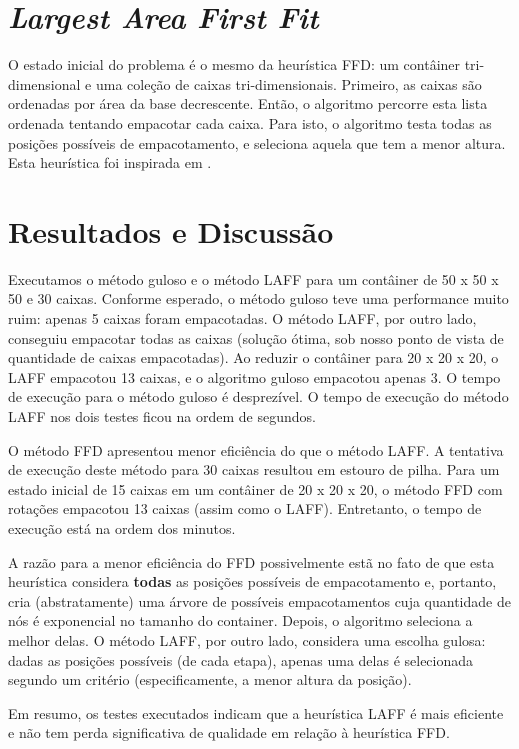 \documentclass[12pt]{article}
\begin{document}
\section{\emph{Largest Area First Fit}}

O estado inicial do problema é o mesmo da heurística FFD: um contâiner tri-dimensional e uma coleção de caixas tri-dimensionais. Primeiro, as caixas são ordenadas por área da base decrescente. Então, o algoritmo percorre esta lista ordenada tentando empacotar cada caixa. Para isto, o algoritmo testa todas as posições possíveis de empacotamento, e seleciona aquela que tem a menor altura. Esta heurística foi inspirada em \cite{gurbuz}.

\section{Resultados e Discussão}

Executamos o método guloso e o método LAFF para um contâiner de 50 x 50 x 50 e 30 caixas. Conforme esperado, o método guloso teve uma performance muito ruim: apenas 5 caixas foram empacotadas. O método LAFF, por outro lado, conseguiu empacotar todas as caixas (solução ótima, sob nosso ponto de vista de quantidade de caixas empacotadas). Ao reduzir o contâiner para 20 x 20 x 20, o LAFF empacotou 13 caixas, e o algoritmo guloso empacotou apenas 3. O tempo de execução para o método guloso é desprezível. O tempo de execução do método LAFF nos dois testes ficou na ordem de segundos.

O método FFD apresentou menor eficiência do que o método LAFF. A tentativa de execução deste método para 30 caixas resultou em estouro de pilha. Para um estado inicial de 15 caixas em um contâiner de 20 x 20 x 20, o método FFD com rotações empacotou 13 caixas (assim como o LAFF). Entretanto, o tempo de execução está na ordem dos minutos. 

A razão para a menor eficiência do FFD possivelmente estã no fato de que esta heurística considera \textbf{todas} as posições possíveis de empacotamento e, portanto, cria (abstratamente) uma árvore de possíveis empacotamentos cuja quantidade de nós é exponencial no tamanho do container. Depois, o algoritmo seleciona a melhor delas. O método LAFF, por outro lado, considera uma escolha gulosa: dadas as posições possíveis (de cada etapa), apenas uma delas é selecionada segundo um critério (especificamente, a menor altura da posição). 

Em resumo, os testes executados indicam que a heurística LAFF é mais eficiente e não tem perda significativa de qualidade em relação à heurística FFD. 
\end{document}
